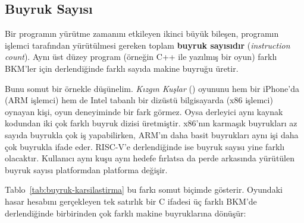 \subsection{Buyruk Sayısı}
\label{subsec:buyruk-sayisi}

Bir programın yürütme zamanını etkileyen ikinci büyük bileşen, programın işlemci tarafından yürütülmesi gereken toplam \textbf{buyruk sayısıdır} (\emph{instruction count}). Aynı üst düzey program (örneğin C++ ile yazılmış bir oyun) farklı BKM'ler için derlendiğinde farklı sayıda makine buyruğu üretir.

Bunu somut bir örnekle düşünelim. \emph{Kızgın Kuşlar} (\kizginkus) oyununu hem bir iPhone'da (ARM işlemci) hem de Intel tabanlı bir dizüstü bilgisayarda (x86 işlemci) oynayan kişi, oyun deneyiminde bir fark görmez. Oysa derleyici aynı kaynak kodundan iki çok farklı buyruk dizisi üretmiştir. x86'nın karmaşık buyrukları az sayıda buyrukla çok iş yapabilirken, ARM'ın daha basit buyrukları aynı işi daha çok buyrukla ifade eder. RISC-V\@'e derlendiğinde ise buyruk sayısı yine farklı olacaktır. Kullanıcı aynı kuşu aynı hedefe fırlatsa da perde arkasında yürütülen buyruk sayısı platformdan platforma değişir.

Tablo~\ref{tab:buyruk-karsilastirma} bu farkı somut biçimde gösterir. Oyundaki hasar hesabını gerçekleyen tek satırlık bir C ifadesi üç farklı BKM'de derlendiğinde birbirinden çok farklı makine buyruklarına dönüşür:

